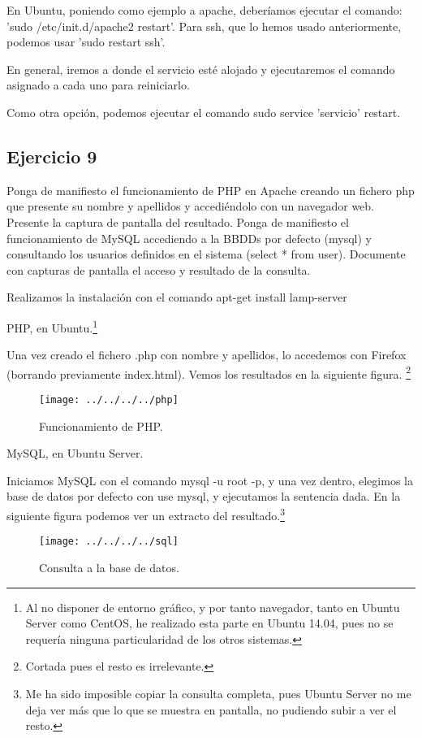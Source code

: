 \documentclass[a4paper, 11pt]{article} %
\begin{document}
En Ubuntu, poniendo como ejemplo a apache, deberíamos ejecutar el comando: 'sudo /etc/init.d/apache2 restart'. Para ssh, que lo hemos usado anteriormente, podemos usar 'sudo restart ssh'. 

En general, iremos a donde el servicio esté alojado y ejecutaremos el comando asignado a cada uno para reiniciarlo. 

Como otra opción, podemos ejecutar el comando sudo service 'servicio' restart. 

\subsection{Ejercicio 9}
Ponga de manifiesto el funcionamiento de PHP en Apache creando un fichero php que presente su nombre y apellidos y accediéndolo con un navegador web. Presente la captura de pantalla del resultado. Ponga de manifiesto el funcionamiento de MySQL accediendo a la BBDDs por defecto (mysql) y consultando los usuarios definidos en el sistema (select * from user). Documente con capturas de pantalla el acceso y resultado de la consulta.

Realizamos la instalación con el comando apt-get install lamp-server

PHP, en Ubuntu.\footnote{Al no disponer de entorno gráfico, y por tanto navegador, tanto en Ubuntu Server como CentOS, he realizado esta parte en Ubuntu 14.04, pues no se requería ninguna particularidad de los otros sistemas.}


Una vez creado el fichero .php con nombre y apellidos, lo accedemos con Firefox (borrando previamente index.html). Vemos los resultados en la siguiente figura. \footnote{Cortada pues el resto es irrelevante.}

\pagebreak

\begin{figure}[htpb]
\texttt{[image: ../../../../php]}
\caption{Funcionamiento de PHP.}
\end{figure}


MySQL, en Ubuntu Server. 

Iniciamos MySQL con el comando mysql -u root -p, y una vez dentro, elegimos la base de datos por defecto con use mysql, y ejecutamos la sentencia dada. En la siguiente figura podemos ver un extracto del resultado.\footnote{Me ha sido imposible copiar la consulta completa, pues Ubuntu Server no me deja ver más que lo que se muestra en pantalla, no pudiendo subir a ver el resto.}

\begin{figure}[htpb]
\texttt{[image: ../../../../sql]}
\caption{Consulta a la base de datos. }
\end{figure}
\end{document}
